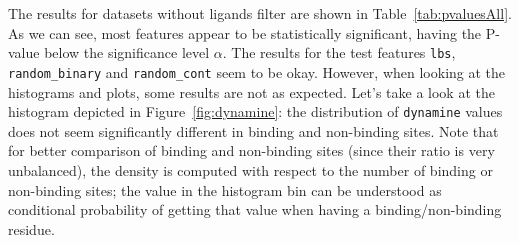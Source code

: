 The results for datasets without ligands filter are shown in Table~\ref{tab:pvaluesAll}. As we can see, most features appear to be statistically significant, having the P-value below the significance level $\alpha$. The results for the test features \texttt{lbs}, \texttt{random\_binary} and \texttt{random\_cont} seem to be okay. However, when looking at the histograms and plots, some results are not as expected. Let's take a look at the histogram depicted in Figure~\ref{fig:dynamine}: the distribution of \texttt{dynamine} values does not seem significantly different in binding and non-binding sites. Note that for better comparison of binding and non-binding sites (since their ratio is very unbalanced), the density is computed with respect to the number of binding or non-binding sites; the value in the histogram bin can be understood as conditional probability of getting that value when having a binding/non-binding residue.


